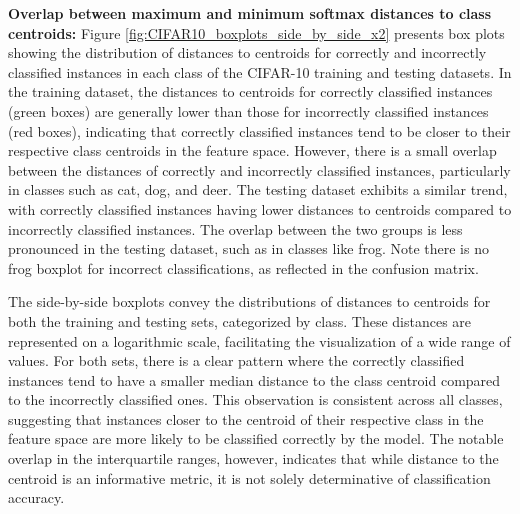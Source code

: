 \noindent \textbf{Overlap between maximum and minimum softmax distances to class centroids:} Figure \ref{fig:CIFAR10_boxplots_side_by_side_x2} presents box plots showing the distribution of distances to centroids for correctly and incorrectly classified instances in each class of the CIFAR-10 training and testing datasets. In the training dataset, the distances to centroids for correctly classified instances (green boxes) are generally lower than those for incorrectly classified instances (red boxes), indicating that correctly classified instances tend to be closer to their respective class centroids in the feature space. However, there is a small overlap between the distances of correctly and incorrectly classified instances, particularly in classes such as cat, dog, and deer. The testing dataset exhibits a similar trend, with correctly classified instances having lower distances to centroids compared to incorrectly classified instances. The overlap between the two groups is less pronounced in the testing dataset, such as in classes like frog. Note there is no frog boxplot for incorrect classifications, as reflected in the confusion matrix.


The side-by-side boxplots convey the distributions of distances to centroids for both the training and testing sets, categorized by class. These distances are represented on a logarithmic scale, facilitating the visualization of a wide range of values. For both sets, there is a clear pattern where the correctly classified instances tend to have a smaller median distance to the class centroid compared to the incorrectly classified ones. This observation is consistent across all classes, suggesting that instances closer to the centroid of their respective class in the feature space are more likely to be classified correctly by the model. The notable overlap in the interquartile ranges, however, indicates that while distance to the centroid is an informative metric, it is not solely determinative of classification accuracy.

